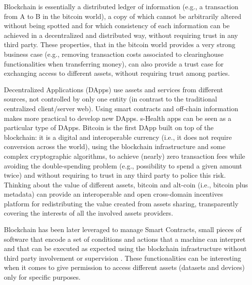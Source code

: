 \documentclass[conference]{IEEEtran}
\begin{document}

Blockchain is essentially a distributed ledger of information (e.g., a transaction from A to B in the bitcoin world), a copy of which cannot be arbitrarily altered without being spotted and for which consistency of each information can be achieved in a decentralized and distributed way, without requiring trust in any third party. These properties, that in the bitcoin world provides a very strong business case (e.g., removing transaction costs associated to clearinghouse functionalities when transferring money), can also provide a trust case for exchanging access to different assets, without requiring trust among parties.

Decentralized Applications (DApps) use assets and services from different sources, not controlled by only one entity (in contrast to the traditional centralized client/server web). Using smart contracts and off-chain information makes more practical to develop new DApps. s-Health apps can be seen as a particular type of DApps. Bitcoin is the first DApp built on top of the blockchain: it is a digital and interoperable currency (i.e., it does not require conversion across the world), using the blockchain infrastructure and some complex cryptographic algorithms, to achieve (nearly) zero transaction fees while avoiding the double-spending problem (e.g., possibility to spend a given amount twice) and without requiring to trust in any third party to police this risk. Thinking about the value of different assets, bitcoin and alt-coin (i.e., bitcoin plus metadata) can provide an interoperable and open cross-domain incentives platform for redistributing the value created from assets sharing, transparently covering the interests of all the involved assets providers.

Blockchain has been later leveraged to manage Smart Contracts, small pieces of software that encode a set of conditions and actions that a machine can interpret and that can be executed as expected using the blockchain infrastructure without third party involvement or supervision \cite{Buterin2014}. These functionalities can be interesting when it comes to give permission to access different assets (datasets and devices) only for specific purposes.
\end{document}
